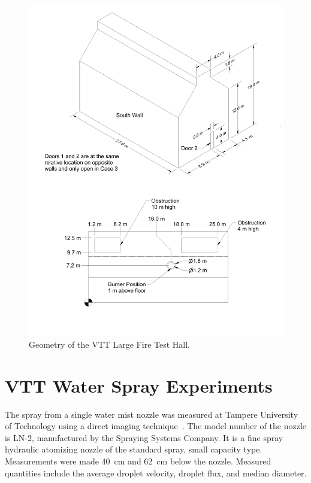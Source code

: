 \begin{figure}[p]
\includegraphics[width=\textwidth]{FIGURES/VTT/VTT_Drawing}
\caption[Geometry of the VTT Large Fire Test Hall]{Geometry of the VTT Large Fire Test Hall.}
\label{VTT_Drawing}
\end{figure}


\section{VTT Water Spray Experiments}
\label{VTT_Water_Spray_Description}

The spray from a single water mist nozzle was measured at Tampere University of Technology using a direct imaging technique~\cite{Vaari:2012}. The model number of the nozzle is LN-2, manufactured by the Spraying Systems Company. It is a fine spray hydraulic atomizing nozzle of the standard spray, small capacity type. Measurements were made 40~cm and 62~cm below the nozzle. Measured quantities include the average droplet velocity, droplet flux, and median diameter.


